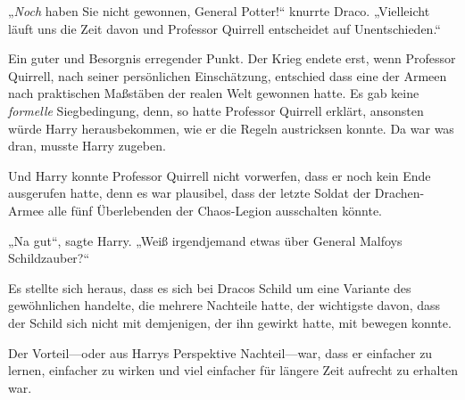 „\emph{Noch} haben Sie nicht gewonnen, General Potter!“ knurrte Draco. „Vielleicht läuft uns die Zeit davon und Professor Quirrell entscheidet auf Unentschieden.“

Ein guter und Besorgnis erregender Punkt. Der Krieg endete erst, wenn Professor Quirrell, nach seiner persönlichen Einschätzung, entschied dass eine der Armeen nach praktischen Maßstäben der realen Welt gewonnen hatte. Es gab keine \emph{formelle} Siegbedingung, denn, so hatte Professor Quirrell erklärt, ansonsten würde Harry herausbekommen, wie er die Regeln austricksen konnte. Da war was dran, musste Harry zugeben.

Und Harry konnte Professor Quirrell nicht vorwerfen, dass er noch kein Ende ausgerufen hatte, denn es war plausibel, dass der letzte Soldat der Drachen-Armee alle fünf Überlebenden der Chaos-Legion ausschalten könnte.

„Na gut“, sagte Harry. „Weiß irgendjemand etwas über General Malfoys Schildzauber?“

Es stellte sich heraus, dass es sich bei Dracos Schild um eine Variante des gewöhnlichen  handelte, die mehrere Nachteile hatte, der wichtigste davon, dass der Schild sich nicht mit demjenigen, der ihn gewirkt hatte, mit bewegen konnte.

Der Vorteil—oder aus Harrys Perspektive Nachteil—war, dass er einfacher zu lernen, einfacher zu wirken und viel einfacher für längere Zeit aufrecht zu erhalten war.

